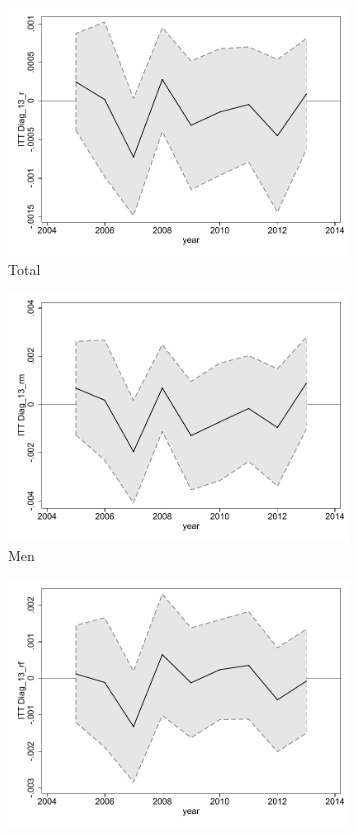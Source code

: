 \documentclass[a4paper ]{article}
\begin{document}
\begin{figure}[h!]
	\centering
	\begin{subfigure}[t]{0.31\textwidth}
		\centering
		\includegraphics[width=0.99\textwidth]{R1_LC_Diag_13_r}
		\caption{Total}		
	\end{subfigure}
	\begin{subfigure}[t]{0.31\textwidth}
		\centering
		\includegraphics[width=0.99\textwidth]{R1_LC_Diag_13_rm}
		\caption{Men}		
	\end{subfigure}
	\quad
	\begin{subfigure}[t]{0.31\textwidth}
		\centering
		\includegraphics[width=0.99\textwidth]{R1_LC_Diag_13_rf}

\end{subfigure}
\end{figure}
\end{document}
